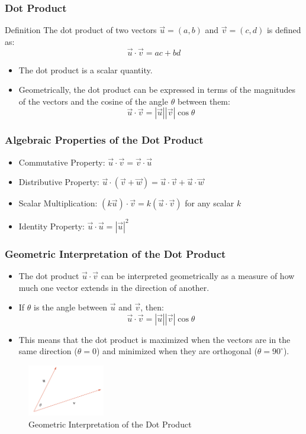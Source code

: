 \documentclass{beamer}
\begin{document}
\begin{frame}
\frametitle{Dot Product}
\begin{block}{Definition}
    The dot product of two vectors \(\vec{u} = (a, b)\) and \(\vec{v} = (c, d)\) is defined as:
    \[
    \vec{u} \cdot \vec{v} = ac + bd
    \]
\end{block}
\begin{itemize}
    \item The dot product is a scalar quantity.
    \item Geometrically, the dot product can be expressed in terms of the magnitudes of the vectors and the cosine of the angle \(\theta\) between them:
    \[
    \vec{u} \cdot \vec{v} = |\vec{u}||\vec{v}|\cos\theta
    \]
\end{itemize}
\end{frame}

\begin{frame}
\frametitle{Algebraic Properties of the Dot Product}
\begin{itemize}
    \item Commutative Property: \(\vec{u} \cdot \vec{v} = \vec{v} \cdot \vec{u}\)
    \item Distributive Property: \(\vec{u} \cdot (\vec{v} + \vec{w}) = \vec{u} \cdot \vec{v} + \vec{u} \cdot \vec{w}\)
    \item Scalar Multiplication: \((k\vec{u}) \cdot \vec{v} = k(\vec{u} \cdot \vec{v})\) for any scalar \(k\)
    \item Identity Property: \(\vec{u} \cdot \vec{u} = |\vec{u}|^2\)
\end{itemize}
\end{frame}

\begin{frame}
    \frametitle{Geometric Interpretation of the Dot Product}
    \begin{itemize}
        \item The dot product \(\vec{u} \cdot \vec{v}\) can be interpreted geometrically as a measure of how much one vector extends in the direction of another.
        \item If \(\theta\) is the angle between \(\vec{u}\) and \(\vec{v}\), then:
        \[
        \vec{u} \cdot \vec{v} = |\vec{u}||\vec{v}|\cos\theta
        \]
        \item This means that the dot product is maximized when the vectors are in the same direction (\(\theta = 0\)) and minimized when they are orthogonal (\(\theta = 90^\circ\)).
    \end{itemize}
    \begin{figure}
        \centering
        \includegraphics[width=0.3\textwidth]{vector5.png}
        \caption{Geometric Interpretation of the Dot Product}
        \label{fig:dot_product}
    \end{figure}
\end{frame}
\end{document}
